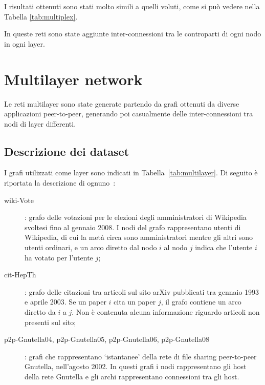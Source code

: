 I risultati ottenuti sono stati molto simili a quelli voluti, come si può vedere nella Tabella \vref{tab:multiplex}.

In queste reti sono state aggiunte inter-connessioni tra le controparti di ogni nodo in ogni layer.



\section{Multilayer network}
Le reti multilayer sono state generate partendo da grafi ottenuti da 
diverse applicazioni peer-to-peer, generando poi casualmente delle inter-connessioni 
tra nodi di layer differenti.  

\subsection{Descrizione dei dataset}
I grafi utilizzati come layer sono indicati in Tabella~\vref{tab:multilayer}.
Di seguito è riportata la descrizione di ognuno~\cite{data:multilayer}:

\begin{description}
    \item[wiki-Vote]: grafo delle votazioni per le elezioni degli amministratori 
    di Wikipedia svoltesi fino al gennaio 2008.
    I nodi del grafo rappresentano utenti di Wikipedia, di cui la metà circa sono 
    amministratori mentre gli altri sono utenti ordinari, e un arco diretto dal nodo 
    $i$ al nodo $j$ indica che l'utente $i$ ha votato per l'utente $j$;

    \item[cit-HepTh]: grafo delle citazioni tra articoli sul sito arXiv
    pubblicati tra gennaio 1993 e aprile 2003.
    Se un paper $i$ cita un paper $j$, il grafo contiene un arco diretto 
    da $i$ a $j$. Non è contenuta alcuna informazione riguardo articoli non 
    presenti sul sito;

    \item[p2p-Gnutella04\textnormal{,} p2p-Gnutella05\textnormal{,} p2p-Gnutella06\textnormal{,} p2p-Gnutella08]: 
    grafi che rappresentano `istantanee' della rete di file sharing peer-to-peer Gnutella, nell'agosto 2002.
    In questi grafi i nodi rappresentano gli host della rete Gnutella e gli archi 
    rappresentano connessioni tra gli host.

\end{description}




